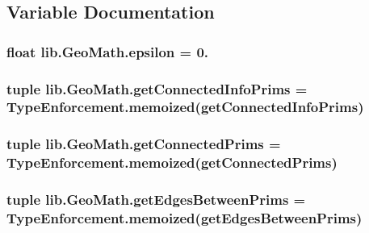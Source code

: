\subsection{Variable Documentation}
\hypertarget{namespacelib_1_1_geo_math_af51b959f0f48e43a0811364de8f1f72d}{
\subsubsection[{epsilon}]{\setlength{\rightskip}{0pt plus 5cm}float lib.\-Geo\-Math.\-epsilon = 0.}}\label{namespacelib_1_1_geo_math_af51b959f0f48e43a0811364de8f1f72d}
\hypertarget{namespacelib_1_1_geo_math_a525ce7e416a909971e86b333cad41791}{
\subsubsection[{get\-Connected\-Info\-Prims}]{\setlength{\rightskip}{0pt plus 5cm}tuple lib.\-Geo\-Math.\-get\-Connected\-Info\-Prims = {\bf Type\-Enforcement.\-memoized}(get\-Connected\-Info\-Prims)}}\label{namespacelib_1_1_geo_math_a525ce7e416a909971e86b333cad41791}
\hypertarget{namespacelib_1_1_geo_math_a7fdec417c173a462923fdbc35f5b6191}{
\subsubsection[{get\-Connected\-Prims}]{\setlength{\rightskip}{0pt plus 5cm}tuple lib.\-Geo\-Math.\-get\-Connected\-Prims = {\bf Type\-Enforcement.\-memoized}(get\-Connected\-Prims)}}\label{namespacelib_1_1_geo_math_a7fdec417c173a462923fdbc35f5b6191}
\hypertarget{namespacelib_1_1_geo_math_a44757a3ba3640c0b77bbf9c46f4761bc}{
\subsubsection[{get\-Edges\-Between\-Prims}]{\setlength{\rightskip}{0pt plus 5cm}tuple lib.\-Geo\-Math.\-get\-Edges\-Between\-Prims = {\bf Type\-Enforcement.\-memoized}(get\-Edges\-Between\-Prims)}}\label{namespacelib_1_1_geo_math_a44757a3ba3640c0b77bbf9c46f4761bc}
